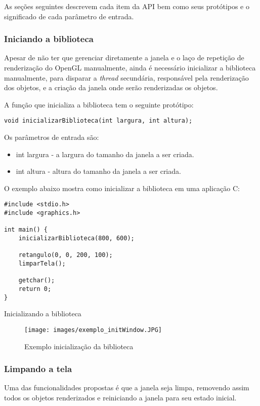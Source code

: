 \documentclass[12pt, %
openright,
oneside, %
a4paper,    %
brazil]{facom-ufu-abntex2}
\begin{document}
As seções seguintes descrevem cada item da API bem como seus protótipos e o significado de cada parâmetro de entrada.

\subsubsection{Iniciando a biblioteca}
Apesar de não ter que gerenciar diretamente a janela e o laço de repetição de renderização do OpenGL manualmente, ainda é necessário inicializar a biblioteca manualmente, para disparar a \textit{thread} secundária, responsável pela renderização dos objetos, e a criação da janela onde serão renderizadas os objetos.

A função que inicializa a biblioteca tem o seguinte protótipo:

\begin{verbatim}
void inicializarBiblioteca(int largura, int altura);
\end{verbatim}

Os parâmetros de entrada são:

\begin{itemize}
    \item int largura - a largura do tamanho da janela a ser criada.
    \item int altura -  altura do tamanho da janela a ser criada.
\end{itemize}

O exemplo abaixo mostra como inicializar a biblioteca em uma aplicação C:
\begin{listing}[ht]
\begin{verbatim}
#include <stdio.h>
#include <graphics.h>

int main() {
    inicializarBiblioteca(800, 600);

    retangulo(0, 0, 200, 100);
    limparTela();

    getchar();
    return 0;
}
\end{verbatim}
\caption{Inicializando a biblioteca}
\label{lst:inicializando_biblioteca}
\end{listing}

\begin{figure}[!htbp]
  \centering
  \texttt{[image: images/exemplo\_initWindow.JPG]}
  \caption{Exemplo inicialização da biblioteca}
  \label{fig:exemplo_initWindow}
\end{figure}

\subsubsection{Limpando a tela}
Uma das funcionalidades propostas é que a janela seja limpa, removendo assim todos os objetos renderizados e reiniciando a janela para seu estado inicial.
\end{document}
